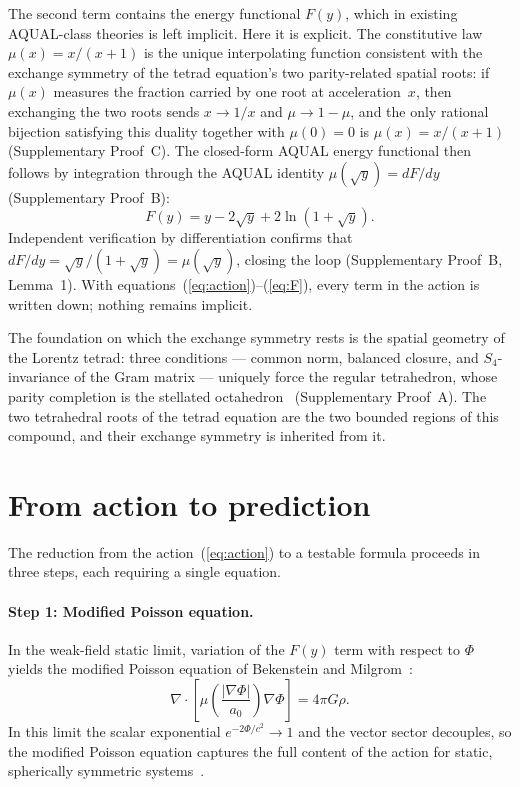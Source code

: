 \documentclass[twocolumn]{iopjournal}
\begin{document}
The second term contains the energy functional $F(y)$, which in
existing AQUAL-class theories is left implicit.  Here it is
explicit.  The constitutive law $\mu(x) = x/(x+1)$ is the unique
interpolating function consistent with the exchange symmetry of
the tetrad equation's two parity-related spatial roots: if
$\mu(x)$ measures the fraction carried by one root at
acceleration~$x$, then exchanging the two roots sends $x \to 1/x$
and $\mu \to 1 - \mu$, and the only rational bijection satisfying
this duality together with $\mu(0) = 0$ is
$\mu(x) = x/(x+1)$ (Supplementary Proof~C).  The closed-form
AQUAL energy functional then follows by integration through the
AQUAL identity $\mu(\sqrt{y}) = dF/dy$
(Supplementary Proof~B):
\begin{equation}
  F(y) = y - 2\sqrt{y} + 2\ln(1 + \sqrt{y}).
  \label{eq:F}
\end{equation}
Independent verification by differentiation confirms that
$dF/dy = \sqrt{y}/(1 + \sqrt{y}) = \mu(\sqrt{y})$, closing the
loop (Supplementary Proof~B, Lemma~1).  With
equations~(\ref{eq:action})--(\ref{eq:F}), every term in the
action is written down; nothing remains implicit.

The foundation on which the exchange symmetry rests is the
spatial geometry of the Lorentz tetrad: three conditions ---
common norm, balanced closure, and $S_4$-invariance of the Gram
matrix --- uniquely force the regular tetrahedron, whose parity
completion is the stellated
octahedron~\cite{Kepler1619} (Supplementary Proof~A).  The two
tetrahedral roots of the tetrad equation are the two bounded
regions of this compound, and their exchange symmetry is
inherited from it.


\section{From action to prediction}

The reduction from the action~(\ref{eq:action}) to a testable
formula proceeds in three steps, each requiring a single
equation.

\paragraph{Step 1: Modified Poisson equation.}
In the weak-field static limit, variation of the
$F(y)$ term with respect to $\Phi$ yields the modified Poisson
equation of Bekenstein and
Milgrom~\cite{BekensteinMilgrom1984}:
\begin{equation}
  \nabla \cdot \left[\mu\!\left(
    \frac{|\nabla\Phi|}{a_0}\right) \nabla\Phi\right]
  = 4\pi G\rho.
  \label{eq:poisson}
\end{equation}
In this limit the scalar exponential
$e^{-2\Phi/c^2} \to 1$ and the vector sector decouples, so
the modified Poisson equation captures the full content of the
action for static, spherically symmetric
systems~\cite{BekensteinMilgrom1984}.
\end{document}
